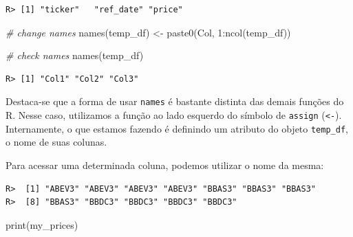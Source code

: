 \documentclass[
  11pt,
]{book}
\newenvironment{Shaded}{\begin{snugshade}}{\end{snugshade}}
\newcommand{\CommentTok}[1]{\textcolor[rgb]{0.37,0.37,0.37}{\textit{#1}}}
\newcommand{\DecValTok}[1]{\textcolor[rgb]{0.06,0.06,0.06}{#1}}
\newcommand{\FunctionTok}[1]{\textcolor[rgb]{0,0,0}{#1}}
\newcommand{\NormalTok}[1]{#1}
\newcommand{\OtherTok}[1]{\textcolor[rgb]{0.37,0.37,0.37}{#1}}
\newcommand{\SpecialCharTok}[1]{\textcolor[rgb]{0,0,0}{#1}}
\newcommand{\StringTok}[1]{\textcolor[rgb]{0.5,0.5,0.5}{#1}}
\begin{document}
\begin{verbatim}
R> [1] "ticker"   "ref_date" "price"
\end{verbatim}

\begin{Shaded}
\begin{Highlighting}[]
\CommentTok{\# change names}
\FunctionTok{names}\NormalTok{(temp\_df) }\OtherTok{\textless{}{-}} \FunctionTok{paste0}\NormalTok{(}\StringTok{\textquotesingle{}Col\textquotesingle{}}\NormalTok{, }\DecValTok{1}\SpecialCharTok{:}\FunctionTok{ncol}\NormalTok{(temp\_df))}

\CommentTok{\# check names}
\FunctionTok{names}\NormalTok{(temp\_df)}
\end{Highlighting}
\end{Shaded}

\begin{verbatim}
R> [1] "Col1" "Col2" "Col3"
\end{verbatim}

Destaca-se que a forma de usar \texttt{names} é bastante distinta das demais funções do R. Nesse caso, utilizamos a função ao lado esquerdo do símbolo de \texttt{assign} (\texttt{\textless{}-}). Internamente, o que estamos fazendo é definindo um atributo do objeto \texttt{temp\_df}, o nome de suas colunas.

Para acessar uma determinada coluna, podemos utilizar o nome da mesma:

\begin{Shaded}
\end{Shaded}

\begin{verbatim}
R>  [1] "ABEV3" "ABEV3" "ABEV3" "ABEV3" "BBAS3" "BBAS3" "BBAS3"
R>  [8] "BBAS3" "BBDC3" "BBDC3" "BBDC3" "BBDC3"
\end{verbatim}

\begin{Shaded}
\begin{Highlighting}[]
\FunctionTok{print}\NormalTok{(my\_prices)}
\end{Highlighting}
\end{Shaded}
\end{document}
